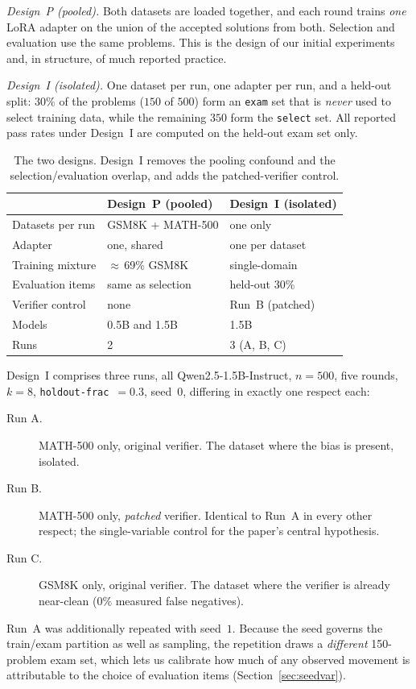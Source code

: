 \documentclass[runningheads]{llncs}
\begin{document}
\emph{Design~P (pooled).} Both datasets are loaded together, and each round
trains \emph{one} LoRA adapter on the union of the accepted solutions from
both. Selection and evaluation use the same problems. This is the design
of our initial experiments and, in structure, of much reported practice.

\emph{Design~I (isolated).} One dataset per run, one adapter per run, and a
held-out split: $30\%$ of the problems ($150$ of $500$) form an
\texttt{exam} set that is \emph{never} used to select training data, while
the remaining $350$ form the \texttt{select} set. All reported pass rates
under Design~I are computed on the held-out exam set only.

\begin{table}[t]
\caption{The two designs. Design~I removes the pooling confound and the
selection/evaluation overlap, and adds the patched-verifier control.}
\label{tab:designs}
\centering
\begin{tabular}{lll}
\toprule
& Design~P (pooled) & Design~I (isolated) \\
\midrule
Datasets per run & GSM8K + MATH-500 & one only \\
Adapter & one, shared & one per dataset \\
Training mixture & $\approx$\,69\% GSM8K & single-domain \\
Evaluation items & same as selection & held-out 30\% \\
Verifier control & none & Run~B (patched) \\
Models & 0.5B and 1.5B & 1.5B \\
Runs & 2 & 3 (A, B, C) \\
\bottomrule
\end{tabular}
\end{table}

Design~I comprises three runs, all Qwen2.5-1.5B-Instruct, $n=500$,
five rounds, $k=8$, \texttt{holdout-frac}~$=0.3$, seed~$0$, differing in
exactly one respect each:
\begin{description}
\item[Run A.] MATH-500 only, original verifier. The dataset where the bias
is present, isolated.
\item[Run B.] MATH-500 only, \emph{patched} verifier. Identical to Run~A in
every other respect; the single-variable control for the paper's central
hypothesis.
\item[Run C.] GSM8K only, original verifier. The dataset where the verifier
is already near-clean ($0\%$ measured false negatives).
\end{description}
Run~A was additionally repeated with seed~$1$. Because the seed governs the
train/exam partition as well as sampling, the repetition draws a
\emph{different} 150-problem exam set, which lets us calibrate how much of
any observed movement is attributable to the choice of evaluation items
(Section~\ref{sec:seedvar}).
\end{document}
